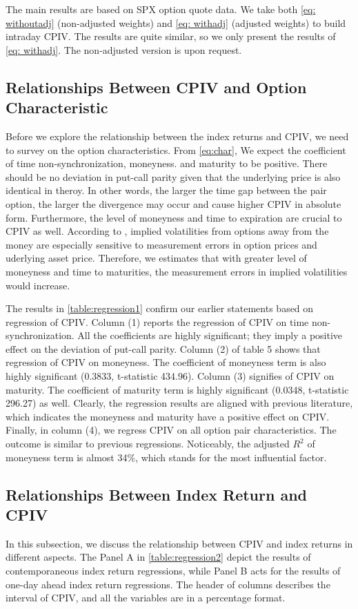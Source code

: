 
The main results are based on SPX option quote data. We take both \autoref{eq: withoutadj} (non-adjusted weights) and \autoref{eq: withadj} (adjusted weights) to build intraday CPIV. The results are quite similar, so we only present the results of \autoref{eq: withadj}. The non-adjusted version is upon request.

\subsection{Relationships Between CPIV and Option Characteristic}
Before we explore the relationship between the index returns and CPIV, we need to survey on the option characteristics. From \autoref{eq:char}, We expect the coefficient of time non-synchronization, moneyness. and maturity to be positive. There should be no deviation in put-call parity given that the underlying price is also identical in theroy. In other words, the larger the time gap between the pair option, the larger the divergence may occur and cause higher CPIV in absolute form. Furthermore, the level of moneyness and time to expiration are crucial to CPIV as well. According to \textcite{hentschel2003errors}, implied volatilities from options away from the money are especially sensitive to measurement errors in option prices and uderlying asset price. Therefore, we estimates that with greater level of moneyness and time to maturities, the measurement errors in implied volatilities would increase. 

The results in \autoref{table:regression1} confirm our earlier statements based on regression of CPIV. Column (1) reports the regression of CPIV on time non-synchronization. All the coefficients are highly significant; they imply a positive effect on the deviation of put-call parity. Column (2) of table 5 shows that regression of CPIV on moneyness. The coefficient of moneyness term is also highly significant (0.3833, t-statistic 434.96). Column (3) signifies of CPIV on maturity. The coefficient of maturity term is highly significant (0.0348, t-statistic 296.27) as well. Clearly, the regression results are aligned with previous literature, which indicates the moneyness and maturity have a positive effect on CPIV. Finally, in column (4), we regress CPIV on all option pair characteristics. The outcome is similar to previous regressions. Noticeably, the adjusted $R^{2}$ of moneyness term is almost 34\%, which stands for the most influential factor.  

\subsection{Relationships Between Index Return and CPIV}
In this subsection, we discuss the relationship between CPIV and index returns in different aspects. The Panel A in \autoref{table:regression2} depict the results of contemporaneous index return regressions, while Panel B acts for the results of one-day ahead index return regressions. The header of columns describes the interval of CPIV, and all the variables are in a percentage format. 

